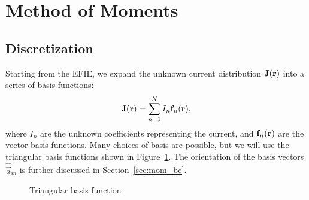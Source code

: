 \section{Method of Moments}

\subsection{Discretization}
Starting from the EFIE, we expand the unknown current distribution $\mathbf{J}(\mathbf{r})$ into a series of basis functions:
\begin{equation}
	\mathbf{J}(\mathbf{r}) = \sum_{n = 1}^{N} I_n \mathbf{f}_n(\mathbf{r}),
	\label{eq:j_exp}
\end{equation}
where $I_n$ are the unknown coefficients representing the current, and $\mathbf{f}_n(\mathbf{r})$ are the vector basis functions. Many choices of basis  are possible, but we will use the triangular basis functions shown in Figure~\ref{fig:mom_basis}. The orientation of the basis vectors $\hat{\vec{a}}_m$ is further discussed in Section~\ref{sec:mom_bc}.
\begin{figure}[!ht]
	\centering
	
	\caption{Triangular basis function}
	\label{fig:mom_basis}
\end{figure}

